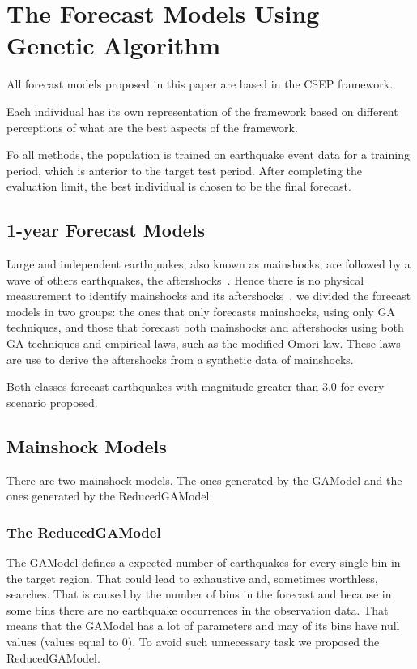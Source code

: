 \section{The Forecast Models Using Genetic Algorithm}\label{Models}

All forecast models proposed in this paper are based in the
CSEP framework.

Each individual has its own representation of the framework based on
different perceptions of what are the best aspects of the framework.

Fo all methods, the population is trained on earthquake event data for a training
period, which is anterior to the target test period. After completing
the evaluation limit, the best individual is chosen to be the final
forecast.

\subsection{1-year Forecast Models}
Large and independent earthquakes, also known as mainshocks, are
followed by a wave of others earthquakes, the
aftershocks~\cite{schorlemmer2010first}. Hence there is no physical
measurement to identify mainshocks and its
aftershocks~\cite{schorlemmer2010first}, we divided the forecast
models in two groups: the ones that only forecasts mainshocks, using only GA techniques, and those that forecast both mainshocks and aftershocks using both GA techniques and empirical laws, such as the modified Omori law. These laws are use to derive the aftershocks from a synthetic data of mainshocks. 

Both classes forecast earthquakes with magnitude greater than 3.0 for
every scenario proposed.%


\subsection{Mainshock Models}\label{mainshocksMethods}
There are two mainshock models. The ones generated by the GAModel and the ones generated by the ReducedGAModel.

\subsubsection{The ReducedGAModel}\label{ReducedGAModel}
The GAModel defines a expected number of earthquakes for every single bin in the target region. That could lead to exhaustive and, sometimes worthless, searches. That is caused by the number of bins in the forecast and because in some bins there are no earthquake occurrences in the observation data. That means that the GAModel has a lot of parameters and may of its bins have null values (values equal to 0). To avoid such unnecessary task we proposed the ReducedGAModel.

